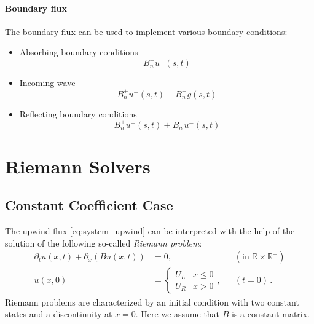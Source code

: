 \documentclass[a4paper,12pt]{article}
\theoremstyle{definition}
\theoremstyle{definition}
\begin{document}
\paragraph{Boundary flux}

The boundary flux can be used to implement various boundary conditions:

\begin{itemize}
	\item Absorbing boundary conditions
	$$B_n^+ u^-(s,t)$$
	\item Incoming wave
	$$B_n^+ u^-(s,t) + B_n^- g(s,t) $$
	\item Reflecting boundary conditions\\
	$$B_n^+ u^-(s,t) + B_n^- u^-(s,t) $$
\end{itemize}

\section{Riemann Solvers}

\subsection*{Constant Coefficient Case}

The upwind flux \eqref{eq:system_upwind} can be interpreted with the help of the solution of the
following so-called \textit{Riemann problem}:
\begin{align*}
\partial_t u(x,t) + \partial_x (B u(x,t)) &= 0, &&(\text{in $\mathbb{R}\times\mathbb{R}^+$})\\
u(x,0) &= \left\{\begin{array}{ll}
U_L & x \leq 0\\ U_R & x > 0
\end{array}\right ., &&(t=0)\,.
\end{align*}
Riemann problems are characterized by an initial condition with two
constant states and a discontinuity at $x=0$. Here we assume that $B$ is a constant matrix.
\end{document}
